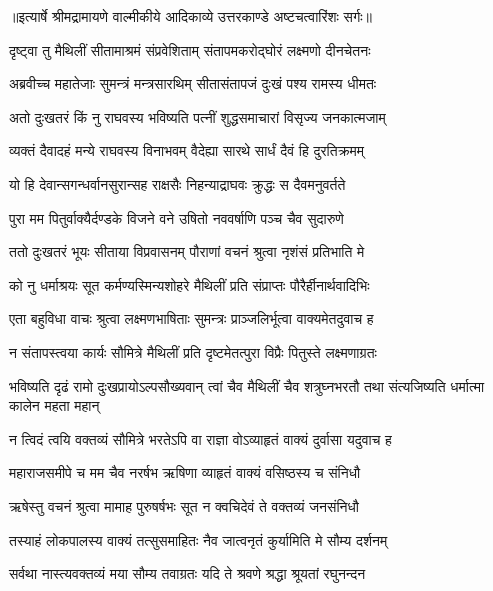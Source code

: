 {॥इत्यार्षे श्रीमद्रामायणे वाल्मीकीये आदिकाव्ये उत्तरकाण्डे अष्टचत्वारिंशः सर्गः॥}


\twolineshloka
{दृष्ट्वा तु मैथिलीं सीतामाश्रमं संप्रवेशिताम्}
{संतापमकरोद्घोरं लक्ष्मणो दीनचेतनः} %

\twolineshloka
{अब्रवीच्च महातेजाः सुमन्त्रं मन्त्रसारथिम्}
{सीतासंतापजं दुःखं पश्य रामस्य धीमतः} %

\twolineshloka
{अतो दुःखतरं किं नु राघवस्य भविष्यति}
{पत्नीं शुद्धसमाचारां विसृज्य जनकात्मजाम्} %

\twolineshloka
{व्यक्तं दैवादहं मन्ये राघवस्य विनाभवम्}
{वैदेह्या सारथे सार्धं दैवं हि दुरतिक्रमम्} %

\twolineshloka
{यो हि देवान्सगन्धर्वानसुरान्सह राक्षसैः}
{निहन्याद्राघवः क्रुद्धः स दैवमनुवर्तते} %

\twolineshloka
{पुरा मम पितुर्वाक्यैर्दण्डके विजने वने}
{उषितो नववर्षाणि पञ्च चैव सुदारुणे} %

\twolineshloka
{ततो दुःखतरं भूयः सीताया विप्रवासनम्}
{पौराणां वचनं श्रुत्वा नृशंसं प्रतिभाति मे} %

\twolineshloka
{को नु धर्माश्रयः सूत कर्मण्यस्मिन्यशोहरे}
{मैथिलीं प्रति संप्राप्तः पौरैर्हीनार्थवादिभिः} %

\twolineshloka
{एता बहुविधा वाचः श्रुत्वा लक्ष्मणभाषिताः}
{सुमन्त्रः प्राञ्जलिर्भूत्वा वाक्यमेतदुवाच ह} %

\twolineshloka
{न संतापस्त्वया कार्यः सौमित्रे मैथिलीं प्रति}
{दृष्टमेतत्पुरा विप्रैः पितुस्ते लक्ष्मणाग्रतः} %

\threelineshloka
{भविष्यति दृढं रामो दुःखप्रायोऽल्पसौख्यवान्}
{त्वां चैव मैथिलीं चैव शत्रुघ्नभरतौ तथा}
{संत्यजिष्यति धर्मात्मा कालेन महता महान्} %

\twolineshloka
{न त्विदं त्वयि वक्तव्यं सौमित्रे भरतेऽपि वा}
{राज्ञा वोऽव्याहृतं वाक्यं दुर्वासा यदुवाच ह} %

\twolineshloka
{महाराजसमीपे च मम चैव नरर्षभ}
{ऋषिणा व्याहृतं वाक्यं वसिष्ठस्य च संनिधौ} %

\twolineshloka
{ऋषेस्तु वचनं श्रुत्वा मामाह पुरुषर्षभः}
{सूत न क्वचिदेवं ते वक्तव्यं जनसंनिधौ} %

\twolineshloka
{तस्याहं लोकपालस्य वाक्यं तत्सुसमाहितः}
{नैव जात्वनृतं कुर्यामिति मे सौम्य दर्शनम्} %

\twolineshloka
{सर्वथा नास्त्यवक्तव्यं मया सौम्य तवाग्रतः}
{यदि ते श्रवणे श्रद्धा श्रूयतां रघुनन्दन} %

